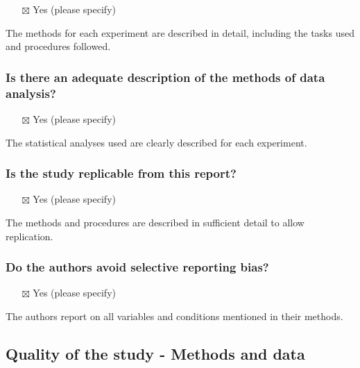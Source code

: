 \documentclass[
  doc, a4paper]{apa7}
\providecommand{\tightlist}{%
  \setlength{\itemsep}{0pt}\setlength{\parskip}{0pt}}
\begin{document}
\begin{itemize}
\tightlist
\item[$\boxtimes$]
  Yes (please specify)
\end{itemize}

The methods for each experiment are described in detail, including the tasks used and procedures followed.

\subsubsection{Is there an adequate description of the methods of data analysis?}\label{is-there-an-adequate-description-of-the-methods-of-data-analysis}

\begin{itemize}
\tightlist
\item[$\boxtimes$]
  Yes (please specify)
\end{itemize}

The statistical analyses used are clearly described for each experiment.

\subsubsection{Is the study replicable from this report?}\label{is-the-study-replicable-from-this-report}

\begin{itemize}
\tightlist
\item[$\boxtimes$]
  Yes (please specify)
\end{itemize}

The methods and procedures are described in sufficient detail to allow replication.

\subsubsection{Do the authors avoid selective reporting bias?}\label{do-the-authors-avoid-selective-reporting-bias}

\begin{itemize}
\tightlist
\item[$\boxtimes$]
  Yes (please specify)
\end{itemize}

The authors report on all variables and conditions mentioned in their methods.

\subsection{Quality of the study - Methods and data}\label{quality-of-the-study---methods-and-data}
\end{document}
